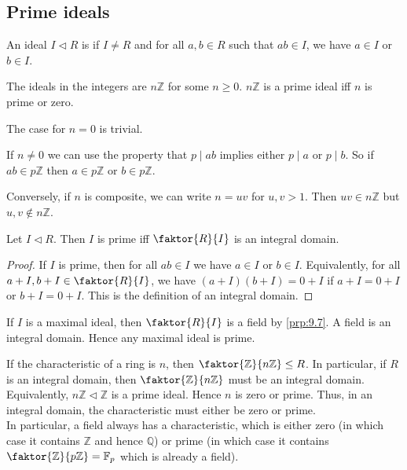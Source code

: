 \subsection{Prime ideals}
\begin{definition}
	An ideal $I \triangleleft R$ is  if $I \neq R$ and for all $a,b \in R$ such that $ab \in I$, we have $a \in I$ or $b \in I$.
\end{definition}

\begin{example}
	The ideals in the integers are $n \mathbb{Z}$ for some $n \geq 0$.
	$n\mathbb Z$ is a prime ideal iff $n$ is prime or zero.

	The case for $n = 0$ is trivial.

	If $n \neq 0$ we can use the property that $p \mid ab$ implies either $p \mid a$ or $p \mid b$.
	So if $ab \in p \mathbb{Z}$ then $a \in p \mathbb{Z}$ or $b \in p \mathbb{Z}$.

	Conversely, if $n$ is composite, we can write $n = uv$ for $u, v > 1$.
	Then $uv \in n\mathbb Z$ but $u,v \not\in n\mathbb Z$.
\end{example}

\begin{proposition} \label{prp:9.8}
	Let $I \triangleleft R$.
	Then $I$ is prime iff $\faktor{R}{I}$ is an integral domain.
\end{proposition}

\begin{proof}
	If $I$ is prime, then for all $ab \in I$ we have $a \in I$ or $b \in I$.
	Equivalently, for all $a + I, b + I \in \faktor{R}{I}$, we have $(a+I)(b+I) = 0+I$ if $a+I = 0+I$ or $b+I = 0+I$.
	This is the definition of an integral domain.
\end{proof}

\begin{remark}
	If $I$ is a maximal ideal, then $\faktor{R}{I}$ is a field by \cref{prp:9.7}.
	A field is an integral domain.
	Hence any maximal ideal is prime.
\end{remark}

\begin{remark}
	If the characteristic of a ring is $n$, then $\faktor{\mathbb Z}{n\mathbb Z} \leq R$.
	In particular, if $R$ is an integral domain, then $\faktor{\mathbb Z}{n\mathbb Z}$ must be an integral domain.
	Equivalently, $n\mathbb Z \triangleleft \mathbb Z$ is a prime ideal.
	Hence $n$ is zero or prime.
	Thus, in an integral domain, the characteristic must either be zero or prime. \\
	In particular, a field always has a characteristic, which is either zero (in which case it contains $\mathbb Z$ and hence $\mathbb Q$) or prime (in which case it contains $\faktor{\mathbb Z}{p\mathbb Z} = \mathbb F_p$ which is already a field).
\end{remark}

